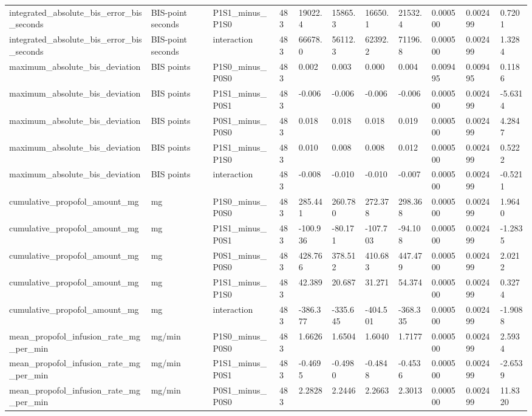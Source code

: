 \begin{tabular}{lllllllllll}
integrated\_absolute\_bis\_error\_bis\_seconds & BIS-point seconds & P1S1\_minus\_P1S0 & 483 & 19022.4 & 15865.3 & 16650.1 & 21532.4 & 0.000500 & 0.002499 & 0.7201 \\
integrated\_absolute\_bis\_error\_bis\_seconds & BIS-point seconds & interaction & 483 & 66678.0 & 56112.3 & 62392.2 & 71196.8 & 0.000500 & 0.002499 & 1.3284 \\
maximum\_absolute\_bis\_deviation & BIS points & P1S0\_minus\_P0S0 & 483 & 0.002 & 0.003 & 0.000 & 0.004 & 0.009495 & 0.009495 & 0.1186 \\
maximum\_absolute\_bis\_deviation & BIS points & P1S1\_minus\_P0S1 & 483 & -0.006 & -0.006 & -0.006 & -0.006 & 0.000500 & 0.002499 & -5.6314 \\
maximum\_absolute\_bis\_deviation & BIS points & P0S1\_minus\_P0S0 & 483 & 0.018 & 0.018 & 0.018 & 0.019 & 0.000500 & 0.002499 & 4.2847 \\
maximum\_absolute\_bis\_deviation & BIS points & P1S1\_minus\_P1S0 & 483 & 0.010 & 0.008 & 0.008 & 0.012 & 0.000500 & 0.002499 & 0.5222 \\
maximum\_absolute\_bis\_deviation & BIS points & interaction & 483 & -0.008 & -0.010 & -0.010 & -0.007 & 0.000500 & 0.002499 & -0.5211 \\
cumulative\_propofol\_amount\_mg & mg & P1S0\_minus\_P0S0 & 483 & 285.441 & 260.780 & 272.378 & 298.368 & 0.000500 & 0.002499 & 1.9640 \\
cumulative\_propofol\_amount\_mg & mg & P1S1\_minus\_P0S1 & 483 & -100.936 & -80.171 & -107.703 & -94.108 & 0.000500 & 0.002499 & -1.2835 \\
cumulative\_propofol\_amount\_mg & mg & P0S1\_minus\_P0S0 & 483 & 428.766 & 378.512 & 410.683 & 447.479 & 0.000500 & 0.002499 & 2.0212 \\
cumulative\_propofol\_amount\_mg & mg & P1S1\_minus\_P1S0 & 483 & 42.389 & 20.687 & 31.271 & 54.374 & 0.000500 & 0.002499 & 0.3274 \\
cumulative\_propofol\_amount\_mg & mg & interaction & 483 & -386.377 & -335.645 & -404.501 & -368.335 & 0.000500 & 0.002499 & -1.9088 \\
mean\_propofol\_infusion\_rate\_mg\_per\_min & mg/min & P1S0\_minus\_P0S0 & 483 & 1.6626 & 1.6504 & 1.6040 & 1.7177 & 0.000500 & 0.002499 & 2.5934 \\
mean\_propofol\_infusion\_rate\_mg\_per\_min & mg/min & P1S1\_minus\_P0S1 & 483 & -0.4695 & -0.4980 & -0.4848 & -0.4536 & 0.000500 & 0.002499 & -2.6539 \\
mean\_propofol\_infusion\_rate\_mg\_per\_min & mg/min & P0S1\_minus\_P0S0 & 483 & 2.2828 & 2.2446 & 2.2663 & 2.3013 & 0.000500 & 0.002499 & 11.8320 \\

\end{tabular}
